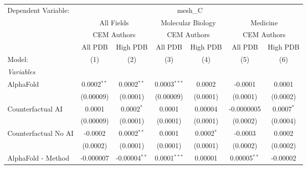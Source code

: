 \begingroup
\centering
\begin{tabular}{lcccccc}
   \tabularnewline \midrule \midrule
   Dependent Variable: & \multicolumn{6}{c}{mesh\_C}\\
 & \multicolumn{2}{c}{All Fields} & \multicolumn{2}{c}{Molecular Biology} & \multicolumn{2}{c}{Medicine} \\
\cmidrule(lr){2-3} \cmidrule(lr){4-5} \cmidrule(lr){6-7}
 & \multicolumn{2}{c}{CEM Authors} & \multicolumn{2}{c}{CEM Authors} & \multicolumn{2}{c}{CEM Authors} \\
\cmidrule(lr){2-3} \cmidrule(lr){4-5} \cmidrule(lr){6-7}
 & \multicolumn{1}{c}{All PDB} & \multicolumn{1}{c}{High PDB} & \multicolumn{1}{c}{All PDB} & \multicolumn{1}{c}{High PDB} & \multicolumn{1}{c}{All PDB} & \multicolumn{1}{c}{High PDB} \\
\cmidrule(lr){2-2} \cmidrule(lr){3-3} \cmidrule(lr){4-4} \cmidrule(lr){5-5} \cmidrule(lr){6-6} \cmidrule(lr){7-7}
   Model:                                                     & (1)            & (2)             & (3)            & (4)           & (5)            & (6)\\  
   \midrule
   \emph{Variables}\\
   AlphaFold                                                  & 0.0002$^{**}$  & 0.0002$^{**}$   & 0.0003$^{***}$ & 0.0002        & -0.0001        & 0.0001\\   
                                                              & (0.00009)      & (0.0001)        & (0.00009)      & (0.0001)      & (0.0001)       & (0.0002)\\   
   Counterfactual AI                                          & 0.0001         & 0.0002$^{*}$    & 0.0001         & 0.00004       & -0.0000005     & 0.0007$^{*}$\\   
                                                              & (0.00009)      & (0.0001)        & (0.0001)       & (0.0001)      & (0.0002)       & (0.0004)\\   
   Counterfactual No AI                                       & -0.0002        & 0.0002$^{**}$   & 0.0001         & 0.0002$^{*}$  & -0.0003        & 0.0002\\   
                                                              & (0.0002)       & (0.0001)        & (0.0001)       & (0.0001)      & (0.0002)       & (0.0002)\\   
   AlphaFold - Method                                         & -0.000007      & -0.00004$^{**}$ & 0.0001$^{***}$ & 0.00001       & 0.00005$^{**}$ & -0.00002\\   

\end{tabular}
